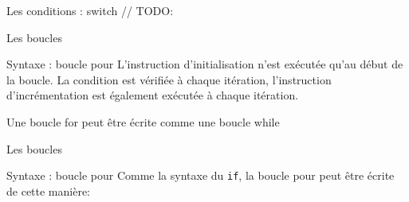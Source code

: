 \documentclass{beamer}
\begin{document}
\begin{darkframes}
	\begin{frame}{Les conditions : switch}
		// TODO:
	\end{frame}



	\begin{frame}{Les boucles}	
		\begin{block}{Syntaxe : boucle pour}
			\forsyntax
			L'instruction \alert{d'initialisation } n'est exécutée qu'au début de la boucle. La \alert{condition} est vérifiée à chaque itération, \alert{l'instruction d'incrémentation} est également exécutée à chaque itération.
		\end{block}
		\begin{alertblock}{Une boucle for peut être écrite comme une boucle while}
			\forWrittenUsingWhile
		\end{alertblock}
	\end{frame}



	\begin{frame}{Les boucles}
		\begin{block}{Syntaxe : boucle pour}
			Comme la syntaxe du \texttt{if}, la boucle pour peut être écrite de cette manière:
			\forsyntaxtwo
		\end{block}
		\begin{center}
			\begin{minipage}[t]{0.48\linewidth}
				\forExmpOne
			\end{minipage}
			\begin{minipage}[t]{0.48\linewidth}
				\forExmpTwo
			\end{minipage}
		\end{center}
	\end{frame}
	


\end{darkframes}
\end{document}
